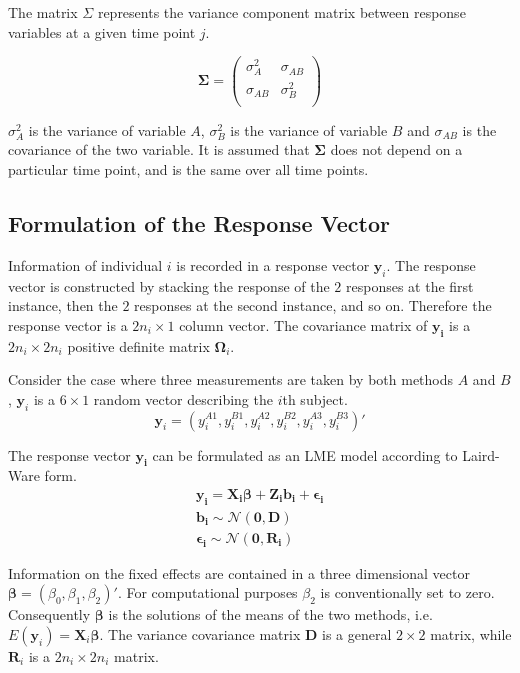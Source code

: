 \documentclass[12pt, a4paper]{report}
\theoremstyle{plain}
\theoremstyle{definition}
\theoremstyle{remark}
\begin{document}
			The matrix $\Sigma$ represents the variance component matrix between response variables at a given time point $j$.
			
			\[
			\boldsymbol{\Sigma} = \left( \begin{array}{cc}
			\sigma^2_{A} & \sigma_{AB} \\
			\sigma_{AB} & \sigma^2_{B}\\
			\end{array}   \right)
			\]
			
			$\sigma^2_{A}$ is the variance of variable $A$, $\sigma^2_{B}$ is the variance of variable $B$ and $\sigma_{AB}$ is the covariance of the two variable. It is assumed that $\boldsymbol{\Sigma}$ does not depend on a particular time point, and is the same over all time points.
			
			
			\subsection{Formulation of the Response Vector}
			Information of individual $i$ is recorded in a response vector $\boldsymbol{y}_{i}$. The response vector is constructed by stacking the response of the $2$ responses at the first instance, then the $2$ responses at the second instance, and so on. Therefore the response vector is a $2n_{i} \times 1$ column vector.
			The covariance matrix of $\boldsymbol{y_{i}}$ is a $2n_{i} \times 2n_{i}$ positive definite matrix $\boldsymbol{\Omega}_{i}$.
			
			Consider the case where three measurements are taken by both methods $A$ and $B$, $\boldsymbol{y}_{i}$ is a $6 \times 1$ random vector describing the $i$th subject.
			\[
			\boldsymbol{y}_{i} = (y_{i}^{A1},y_{i}^{B1},y_{i}^{A2},y_{i}^{B2},y_{i}^{A3},y_{i}^{B3}) \prime
			\]
			
			The response vector $\boldsymbol{y_{i}}$ can be formulated as an LME model according to Laird-Ware form.
			\begin{eqnarray*}
				\boldsymbol{y_{i}} = \boldsymbol{X_{i}\beta}  + \boldsymbol{Z_{i}b_{i}} + \boldsymbol{\epsilon_{i}}\\
				\boldsymbol{b_{i}} \sim \mathcal{N}(\boldsymbol{0,D})\\
				\boldsymbol{\epsilon_{i}} \sim \mathcal{N}(\boldsymbol{0,R_{i}})
			\end{eqnarray*}
			
			Information on the fixed effects are contained in a three dimensional vector $\boldsymbol{\beta} = (\beta_{0},\beta_{1},\beta_{2})\prime$. For computational purposes $\beta_{2}$ is conventionally set to zero. Consequently $\boldsymbol{\beta}$ is the solutions of the means of the two methods, i.e. $E(\boldsymbol{y}_{i})  = \boldsymbol{X}_{i}\boldsymbol{\beta}$. The variance covariance matrix $\boldsymbol{D}$ is a general $2 \times 2$ matrix, while $\boldsymbol{R}_{i}$ is a $2n_{i} \times 2n_{i}$ matrix.
			
\end{document}
